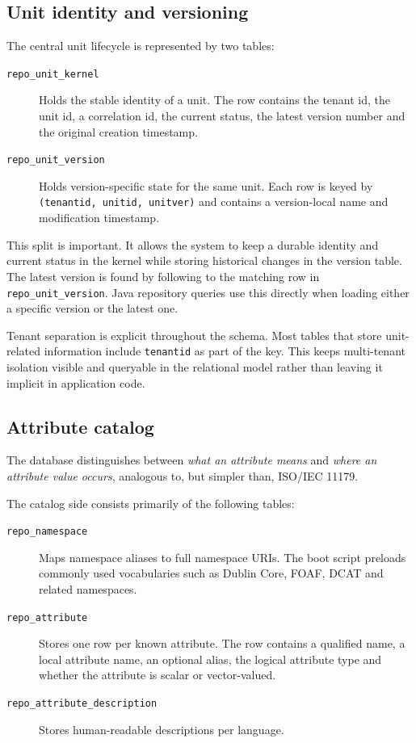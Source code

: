 \subsection{Unit identity and versioning}

The central unit lifecycle is represented by two tables:
\begin{description}
\item[\texttt{repo\_unit\_kernel}] Holds the stable identity of a unit. The row contains the tenant id, the unit id, a correlation id, the current status, the latest version number and the original creation timestamp.
\vspace{.2cm}
\item[\texttt{repo\_unit\_version}] Holds version-specific state for the same unit. Each row is keyed by \texttt{(tenantid, unitid, unitver)} and contains a version-local name and modification timestamp.
\end{description}

This split is important. It allows the system to keep a durable identity and current status in the kernel while storing historical changes in the version table. The latest version is found by following  to the matching row in \texttt{repo\_unit\_version}. Java repository queries use this directly when loading either a specific version or the latest one.

Tenant separation is explicit throughout the schema. Most tables that store unit-related information include \texttt{tenantid} as part of the key. This keeps multi-tenant isolation visible and queryable in the relational model rather than leaving it implicit in application code.

\subsection{Attribute catalog}

The database distinguishes between \emph{what an attribute means} and \emph{where an attribute value occurs}, analogous to, but simpler than, ISO/IEC 11179.

The catalog side consists primarily of the following tables:
\begin{description}
\item[\texttt{repo\_namespace}] Maps namespace aliases to full namespace URIs. The boot script preloads commonly used vocabularies such as Dublin Core, FOAF, DCAT and related namespaces.
\vspace{.2cm}
\item[\texttt{repo\_attribute}] Stores one row per known attribute. The row contains a qualified name, a local attribute name, an optional alias, the logical attribute type and whether the attribute is scalar or vector-valued.
\vspace{.2cm}
\item[\texttt{repo\_attribute\_description}] Stores human-readable descriptions per language.
\end{description}

